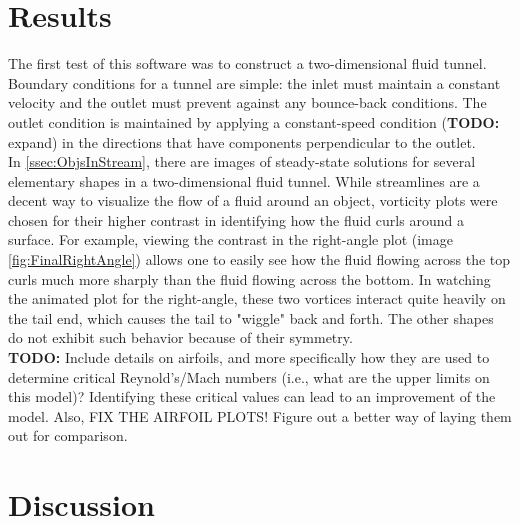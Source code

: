 \documentclass[twoside]{article}
\begin{document}

\section{Results}

\noindent The first test of this software was to construct a two-dimensional fluid tunnel. Boundary conditions for a tunnel are simple: the inlet must maintain a constant velocity and the outlet must prevent against any bounce-back conditions. The outlet condition is maintained by applying a constant-speed condition (\textbf{TODO:} expand) in the directions that have components perpendicular to the outlet.\\

\noindent In \ref{ssec:ObjsInStream}, there are images of steady-state solutions for several elementary shapes in a two-dimensional fluid tunnel. While streamlines are a decent way to visualize the flow of a fluid around an object, vorticity plots were chosen for their higher contrast in identifying how the fluid curls around a surface. For example, viewing the contrast in the right-angle plot (image \ref{fig:FinalRightAngle}) allows one to easily see how the fluid flowing across the top curls much more sharply than the fluid flowing across the bottom. In watching the animated plot for the right-angle, these two vortices interact quite heavily on the tail end, which causes the tail to "wiggle" back and forth. The other shapes do not exhibit such behavior because of their symmetry.\\

\noindent \textbf{TODO:} Include details on airfoils, and more specifically how they are used to determine critical Reynold's/Mach numbers (i.e., what are the upper limits on this model)? Identifying these critical values can lead to an improvement of the model. Also, FIX THE AIRFOIL PLOTS! Figure out a better way of laying them out for comparison.\\



\section{Discussion}
\end{document}
